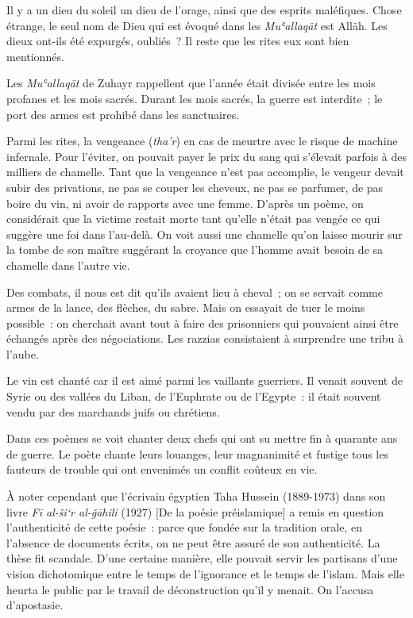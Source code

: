 Il y a un dieu du soleil un dieu de l'orage, ainsi que des esprits
maléfiques. Chose étrange, le seul nom de Dieu qui est évoqué dans les
\emph{Muʿallaqāt} est Allāh. Les dieux ont-ils été expurgés, oubliés~?
Il reste que les rites eux sont bien mentionnés.

Les \emph{Muʿallaqāt} de Zuhayr rappellent que l'année était divisée
entre les mois profanes et les mois sacrés. Durant les mois sacrés, la
guerre est interdite~; le port des armes est prohibé dans les
sanctuaires.

Parmi les rites, la vengeance (\emph{tha'r}) en cas de meurtre avec le
risque de machine infernale. Pour l'éviter, on pouvait payer le prix du
sang qui s'élevait parfois à des milliers de chamelle. Tant que la
vengeance n'est pas accomplie, le vengeur devait subir des privations,
ne pas se couper les cheveux, ne pas se parfumer, de pas boire du vin,
ni avoir de rapports avec une femme. D'après un poème, on considérait
que la victime restait morte tant qu'elle n'était pas vengée ce qui
suggère une foi dans l'au-delà. On voit aussi une chamelle qu'on laisse
mourir sur la tombe de son maître suggérant la croyance que l'homme
avait besoin de sa chamelle dans l'autre vie.

Des combats, il nous est dit qu'ils avaient lieu à cheval~; on se
servait comme armes de la lance, des flèches, du sabre. Mais on essayait
de tuer le moins possible~: on cherchait avant tout à faire des
prisonniers qui pouvaient ainsi être échangés après des négociations.
Les razzias consistaient à surprendre une tribu à l'aube.

Le vin est chanté car il est aimé parmi les vaillants guerriers. Il
venait souvent de Syrie ou des vallées du Liban, de l'Euphrate ou de
l'Egypte~: il était souvent vendu par des marchands juifs ou chrétiens.

Dans ces poèmes se voit chanter deux chefs qui ont su mettre fin à
quarante ans de guerre. Le poète chante leurs louanges, leur magnanimité
et fustige tous les fauteurs de trouble qui ont envenimés un conflit
coûteux en vie.

À noter cependant que l'écrivain égyptien Taha Hussein (1889-1973) dans
son livre \emph{Fī al-ši`r al-ǧāhili} (1927) {[}De la poésie
préislamique{]} a remis en question l'authenticité de cette poésie~:
parce que fondée sur la tradition orale, en l'absence de documents
écrits, on ne peut être assuré de son authenticité. La thèse fit
scandale. D'une certaine manière, elle pouvait servir les partisans
d'une vision dichotomique entre le temps de l'ignorance et le temps de
l'islam. Mais elle heurta le public par le travail de déconstruction
qu'il y menait. On l'accusa d'apostasie.

